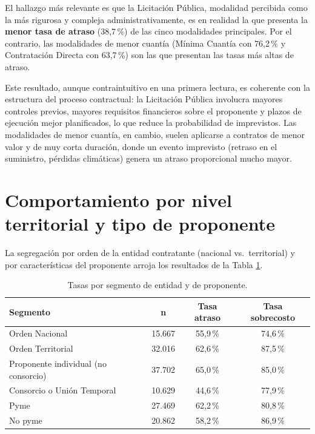 \documentclass[12pt,letterpaper,oneside]{report}
\begin{document}
El hallazgo más relevante es que la Licitación Pública, modalidad percibida
como la más rigurosa y compleja administrativamente, es en realidad la que
presenta la \textbf{menor tasa de atraso} (38,7\,\%) de las cinco modalidades
principales. Por el contrario, las modalidades de menor cuantía (Mínima
Cuantía con 76,2\,\% y Contratación Directa con 63,7\,\%) son las que
presentan las tasas más altas de atraso.

Este resultado, aunque contraintuitivo en una primera lectura, es coherente
con la estructura del proceso contractual: la Licitación Pública involucra
mayores controles previos, mayores requisitos financieros sobre el proponente y
plazos de ejecución mejor planificados, lo que reduce la probabilidad de
imprevistos. Las modalidades de menor cuantía, en cambio, suelen aplicarse a
contratos de menor valor y de muy corta duración, donde un evento imprevisto
(retraso en el suministro, pérdidas climáticas) genera un atraso proporcional
mucho mayor.

\section{Comportamiento por nivel territorial y tipo de proponente}

La segregación por orden de la entidad contratante (nacional vs.\ territorial) y
por características del proponente arroja los resultados de la Tabla
\ref{tab:segmentos}.

\begin{table}[h!]
\centering
\caption{Tasas por segmento de entidad y de proponente.}
\label{tab:segmentos}
\begin{tabular}{lccc}
\toprule
\textbf{Segmento} & \textbf{n} & \textbf{Tasa atraso} & \textbf{Tasa sobrecosto} \\
\midrule
Orden Nacional & 15.667 & 55,9\,\% & 74,6\,\% \\
Orden Territorial & 32.016 & 62,6\,\% & 87,5\,\% \\
Proponente individual (no consorcio) & 37.702 & 65,0\,\% & 85,0\,\% \\
Consorcio o Unión Temporal & 10.629 & 44,6\,\% & 77,9\,\% \\
Pyme & 27.469 & 62,2\,\% & 80,8\,\% \\
No pyme & 20.862 & 58,2\,\% & 86,9\,\% \\
\bottomrule
\end{tabular}
\end{table}
\end{document}
